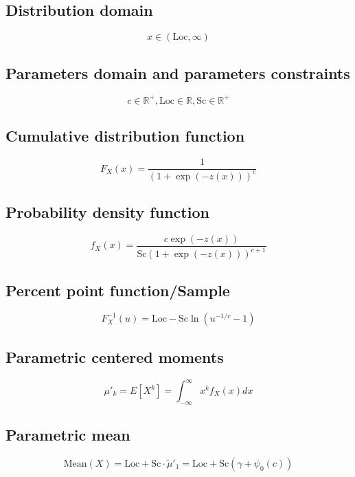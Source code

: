 \documentclass{article}
\begin{document}
\subsection{Distribution domain}
\begin{equation*} x\in\left(\text{Loc},\infty\right) \end{equation*}
\subsection{Parameters domain and parameters constraints}
\begin{equation*} c\in\mathbb{R}^{+}, \text{Loc}\in\mathbb{R}, \text{Sc}\in\mathbb{R}^{+} \end{equation*}
\subsection{Cumulative distribution function}
\begin{equation*} F_{X}\left(x\right)=\frac{1}{\left(1+\exp\left(-z(x)\right)\right)^{c}} \end{equation*}
\subsection{Probability density function}
\begin{equation*} f_{X}\left(x\right)=\frac{c\exp\left(-z(x)\right)}{\text{Sc}\left(1+\exp\left(-z(x)\right)\right)^{c+1}} \end{equation*}
\subsection{Percent point function/Sample}
\begin{equation*} F^{-1}_{X}\left(u\right)=\text{Loc}-\text{Sc}\ln\left(u^{-1/c}-1\right) \end{equation*}
\subsection{Parametric centered moments}
\begin{equation*} \mu'_{k}=E[X^k]=\int_{-\infty }^{\infty }x^{k}f_{X}\left(x\right)dx \end{equation*}
\subsection{Parametric mean}
\begin{equation*} \mathrm{Mean}(X)=\text{Loc}+\text{Sc}\cdot\tilde{\mu}'_{1}=\text{Loc}+\text{Sc}\left(\gamma+\psi_{0}\left(c\right)\right) \end{equation*}
\end{document}
